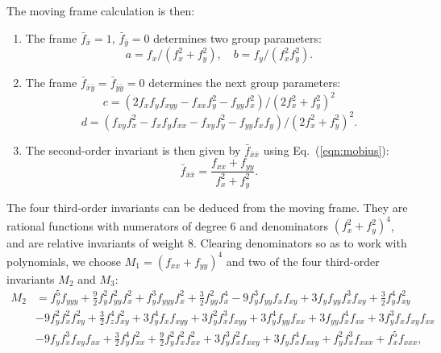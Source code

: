 \documentclass{artjlt}
\begin{document}
The moving frame calculation is then:
\begin{enumerate}
\item The frame $\bar f_{\bar x}=1$, $\bar f_{\bar y}=0$ determines two group parameters:
$$ a = f_x/(f_x^2 + f_y^2),\quad b = f_y/(f_x^2 f_y^2).$$

\item The frame $\bar f_{\bar x \bar y}=\bar f_{\bar y \bar y}=0$ determines the next group parameters:
$$ c = (2 f_xf_yf_{xyy} - f_{xx}f_y^2 - f_{yy}f_x^2)/(2 f_x^2 + f_y^2)^2$$
$$ d = (f_{xy}f_x^2 - f_x f_y f_{xx} - f_{xy}f_y^2 - f_{yy} f_x f_y)/(2 f_x^2 + f_y^2)^2.$$

\item The second-order invariant is then given by $\bar f_{\bar x \bar x}$ using Eq.~(\ref{eqn:mobius}):
$$\bar f_{\bar x \bar x} = \frac{f_{xx}+f_{yy}}{f_x^2 + f_y^2}.$$
\end{enumerate}


The four third-order invariants can be deduced from the moving frame. They
are rational functions with numerators of degree 6 and denominators $(f_x^2
+ f_y^2)^4$, and are relative invariants of weight 8.  Clearing
denominators so as to work with polynomials, we choose $M_1 = (f_{xx} +
f_{yy})^4$ and two of the four third-order invariants $M_2$ and $M_3$:
\begin{align*} M_2&=
f_y ^5 f_{yyy} + \frac{9}{2} f_y ^2 f_{yy}^2 f_x ^2 + 
 f_y ^3 f_{yyy} f_x ^2 + \frac{3}{2} f_{yy}^2 f_x ^4 - 
 9 f_y ^3 f_{yy} f_x  f_{xy} + 
 3 f_y  f_{yy} f_x ^3 f_{xy} + \frac{3}{2} f_y ^4 f_{xy}^2 \\ \nonumber
 &- 9 f_y ^2 f_x ^2 f_{xy}^2 
+ \frac{3}{2} f_z ^4 f_{xy}^2 + 
 3 f_y ^4 f_x  f_{xyy} + 3 f_y ^2 f_x ^3 f_{xyy} + 
 3 f_y ^4 f_{yy} f_{xx} + 3 f_{yy} f_x ^4 f_{xx} + 
 3 f_y ^3 f_x  f_{xy} f_{xx} \\ \nonumber
&- 9 f_y  f_x ^3 f_{xy} f_{xx} 
+ \frac{3}{2} f_y ^4 f_{xx}^2 + 
 \frac{9}{2} f_y ^2 f_x ^2 f_{xx}^2 + 3 f_y ^3 f_x ^2 f_{xxy} + 
 3 f_y  f_x ^4 f_{xxy} + f_y ^2 f_x ^3 f_{xxx} + 
 f_x ^5 f_{xxx}, 
\end{align*}
 
\end{document}
